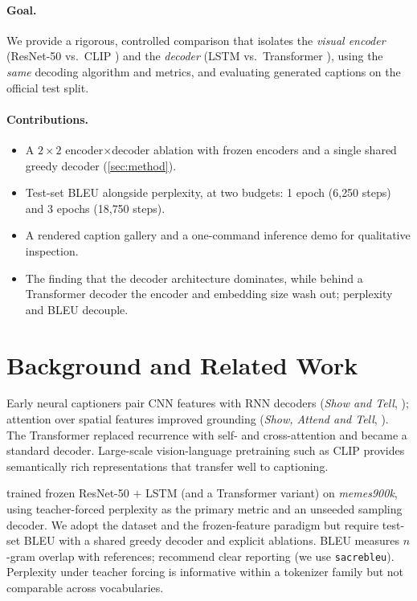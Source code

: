 \documentclass{article}
\theoremstyle{plain}
\theoremstyle{definition}
\theoremstyle{remark}
\begin{document}
\paragraph{Goal.} We provide a rigorous, controlled comparison that isolates the
\emph{visual encoder} (ResNet-50 \citep{he2016deep} vs.\ CLIP
\citep{radford2021learning}) and the \emph{decoder} (LSTM
\citep{hochreiter1997long} vs.\ Transformer \citep{vaswani2017attention}), using
the \emph{same} decoding algorithm and metrics, and evaluating generated
captions on the official test split.

\paragraph{Contributions.}
\begin{itemize}
\item A $2\times2$ encoder$\times$decoder ablation with frozen encoders and a
single shared greedy decoder (\cref{sec:method}).
\item Test-set BLEU \citep{papineni2002bleu,post2018call} alongside
perplexity, at two budgets: 1 epoch (6{,}250 steps) and 3 epochs (18{,}750
steps).
\item A rendered caption gallery and a one-command inference demo for
qualitative inspection.
\item The finding that the decoder architecture dominates, while behind a
Transformer decoder the encoder and embedding size wash out; perplexity and
BLEU decouple.
\end{itemize}

\section{Background and Related Work}
\label{sec:related}

Early neural captioners pair CNN features with RNN decoders (\textit{Show and
Tell}, \citealp{vinyals2015show}); attention over spatial features improved
grounding (\textit{Show, Attend and Tell}, \citealp{xu2015show}). The
Transformer \citep{vaswani2017attention} replaced recurrence with self- and
cross-attention and became a standard decoder. Large-scale vision-language
pretraining such as CLIP \citep{radford2021learning} provides semantically rich
representations that transfer well to captioning.

\citet{deephumor2020} trained frozen ResNet-50 $+$ LSTM (and a Transformer
variant) on \textit{memes900k}, using teacher-forced perplexity as the primary
metric and an unseeded sampling decoder. We adopt the dataset and the
frozen-feature paradigm but require test-set BLEU with a shared greedy decoder
and explicit ablations. BLEU \citep{papineni2002bleu} measures $n$-gram overlap
with references; \citet{post2018call} recommend clear reporting (we use
\texttt{sacrebleu}). Perplexity under teacher forcing is informative within a
tokenizer family but not comparable across vocabularies.
\end{document}
